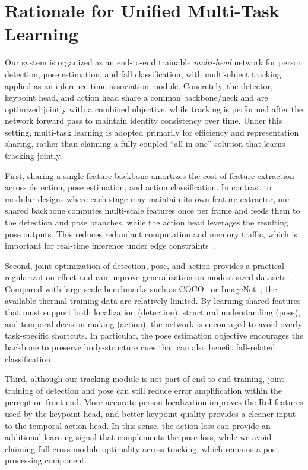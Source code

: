 \section{Rationale for Unified Multi-Task Learning}
\label{sec:intro_multitask}

Our system is organized as an end-to-end trainable \emph{multi-head} network for person detection, pose estimation, and fall classification, with multi-object tracking applied as an inference-time association module. Concretely, the detector, keypoint head, and action head share a common backbone/neck and are optimized jointly with a combined objective, while tracking is performed after the network forward pass to maintain identity consistency over time. Under this setting, multi-task learning is adopted primarily for efficiency and representation sharing, rather than claiming a fully coupled ``all-in-one'' solution that learns tracking jointly.

First, sharing a single feature backbone amortizes the cost of feature extraction across detection, pose estimation, and action classification. In contrast to modular designs where each stage may maintain its own feature extractor, our shared backbone computes multi-scale features once per frame and feeds them to the detection and pose branches, while the action head leverages the resulting pose outputs. This reduces redundant computation and memory traffic, which is important for real-time inference under edge constraints~\cite{caruana1997multitask}.

Second, joint optimization of detection, pose, and action provides a practical regularization effect and can improve generalization on modest-sized datasets~\cite{ruder2017overview}. Compared with large-scale benchmarks such as COCO~\cite{lin2014microsoft} or ImageNet~\cite{deng2009imagenet}, the available thermal training data are relatively limited. By learning shared features that must support both localization (detection), structural understanding (pose), and temporal decision making (action), the network is encouraged to avoid overly task-specific shortcuts. In particular, the pose estimation objective encourages the backbone to preserve body-structure cues that can also benefit fall-related classification.

Third, although our tracking module is not part of end-to-end training, joint training of detection and pose can still reduce error amplification within the perception front-end. More accurate person localization improves the RoI features used by the keypoint head, and better keypoint quality provides a cleaner input to the temporal action head. In this sense, the action loss can provide an additional learning signal that complements the pose loss, while we avoid claiming full cross-module optimality across tracking, which remains a post-processing component.

